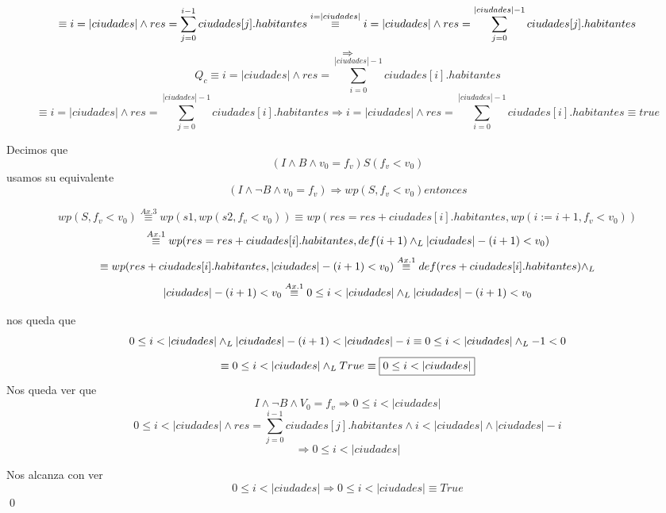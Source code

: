 \documentclass[10pt,a4paper]{article}
\begin{document}
\begin{demoPc}
\begin{demo3}
			\[\equiv i=|ciudades| \land  res=\sum_{j=0}^{i-1} ciudades[j].habitantes \overset{{\tiny i= |ciudades|}}{\equiv} i=|ciudades| \land  res=\sum_{j=0}^{|ciudades|-1} ciudades[j].habitantes
			\]
			\[\Longrightarrow\]
			\[ Q_{c} \equiv i = |ciudades| \land res=\sum_{i=0}^{|ciudades|-1} ciudades[i].habitantes
			\]
			\[\equiv i = |ciudades| \land res=\sum_{j=0}^{|ciudades|-1} ciudades[i].habitantes \Longrightarrow i = |ciudades| \land res=\sum_{i=0}^{|ciudades|-1} ciudades[i].habitantes \equiv true\]
			
			
			
		\end{demo3}
		
		
		
		
		\begin{demo4}
			Decimos que
			\[
			(I \land B \land v_{0}=f_{v}) S (f_{v}< v_{0})\]  usamos su equivalente \[(I \land \neg B \land v_{0}=f_{v}) \Longrightarrow wp(S,f_{v} < v_{0}) entonces\]
			
			\[wp(S,f_{v}<v_{0}) \overset{Ax. 3}{\equiv} wp(s1,wp(s2,f_{v}<v_{0})) \equiv wp(res=res+ciudades[i].habitantes,wp(i:=i+1,f_{v} < v_{0})) \]
			\[\overset{Ax. 1}{\equiv} wp(res=res+ciudades[i].habitantes,def(i+1)\land _L |ciudades|-(i+1) < v_{0}) \]
			\[\equiv wp(res+ciudades[i].habitantes,|ciudades|-(i+1)< v_{0}) \overset{Ax. 1}{\equiv} def(res+ciudades[i].habitantes) \land _L\]
			\[|ciudades| -(i+1) < v_{0} \overset{Ax. 1}{\equiv} 0 \leq i<|ciudades| \yLuego |ciudades|-(i+1)< v_{0} \]
			
			\noindent  %
			nos queda que
			\[0 \leq i <|ciudades| \yLuego |ciudades|-(i+1) < |ciudades| - i \equiv 0 \leq i <|ciudades| \yLuego -1 < 0 \]
			\[\equiv 0 \leq i <|ciudades| \yLuego True \equiv \boxed{0 \leq i <|ciudades|}\]
			Nos queda ver que
			\[I \land \neg B \land V_{0}=f_{v} \Longrightarrow 0 \leq i <|ciudades|\]
			\[ 0 \leq i < |ciudades| \land res= \sum_{j=0}^{i-1} ciudades[j].habitantes \land i < \lvert ciudades \rvert \land \lvert ciudades \rvert - i\]
			\[\Longrightarrow  0 \leq i < |ciudades|\]
			
			Nos alcanza con ver 
			\[ 0 \leq i < |ciudades| \Longrightarrow  0 \leq i < |ciudades| \equiv True\]
			\qed
			

\end{demo4}
\end{demoPc}
\end{document}
